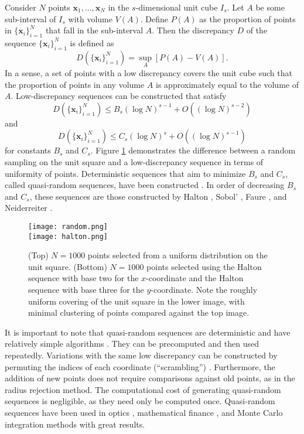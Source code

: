\documentclass{article}
\begin{document}
Consider $N$ points $\mathbf{x}_1,\dots,\mathbf{x}_N$ in the $s$-dimensional unit cube $I_s$. Let $A$ be some sub-interval of $I_s$ with volume $V(A)$. Define $P(A)$ as the proportion of points in $\{\mathbf{x}_i\}_{i=1}^N$ that fall in the sub-interval $A$. Then the discrepancy $D$ of the sequence $\{\mathbf{x}_i\}_{i=1}^N$ is defined as
\begin{equation}
D\left(\{\mathbf{x}_i\}_{i=1}^N\right)=\sup_A\left[P(A)-V(A)\right].
\end{equation}In a sense, a set of points with a low discrepancy covers the unit cube such that the proportion of points in any volume $A$ is approximately equal to the volume of $A$. Low-discrepancy sequences can be constructed that satisfy
\begin{equation}
D\left(\{\mathbf{x}_i\}_{i=1}^N\right)\leq B_s(\log N)^{s-1}+O((\log N)^{s-2})
\end{equation}and 
\begin{equation}
D\left(\{\mathbf{x}_i\}_{i=1}^N\right)\leq C_s(\log N)^{s}+O((\log N)^{s-1})
\end{equation}for constants $B_s$ and $C_s$. Figure \ref{fig:halton} demonstrates the difference between a random sampling on the unit square and a low-discrepancy sequence in terms of uniformity of points. Deterministic sequences that aim to minimize $B_s$ and $C_s$, called quasi-random sequences, have been constructed \cite{niederreiter1988low}. In order of decreasing $B_s$ and $C_s$, these sequences are those constructed by Halton \cite{halton1960efficiency}, Sobol' \cite{soboldistribution}, Faure \cite{faure1982discrepance}, and Neiderreiter \cite{niederreiter1987point}.

\begin{figure}
\center \texttt{[image: random.png]}\\\texttt{[image: halton.png]}
\caption{(Top) $N=1000$ points selected from a uniform distribution on the unit square. (Bottom) $N=1000$ points selected using the Halton sequence with base two for the $x$-coordinate and the Halton sequence with base three for the $y$-coordinate. Note the roughly uniform covering of the unit square in the lower image, with minimal clustering of points compared against the top image.}
\label{fig:halton}
\end{figure}

It is important to note that  quasi-random sequences are deterministic and have relatively simple algorithms \cite{dalal2008low}. They can be precomputed and then used repeatedly. Variations with the same low discrepancy can be constructed by permuting the indices of each coordinate (``scrambling'') \cite{mascagni2004scrambled}. Furthermore, the addition of new points does not require comparisons against old points, as in the radius rejection method. The computational cost of generating quasi-random sequences is negligible, as they need only be computed once. Quasi-random sequences have been used in optics \cite{ide2003dot}, mathematical finance \cite{ninomiya1996toward}, and Monte Carlo integration methods \cite{dalal2008low,halton1960efficiency,mascagni2004scrambled,morokoff1994quasi,soboldistribution} with great results. 
\end{document}
